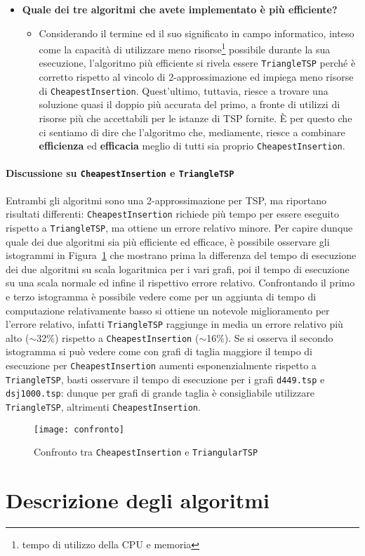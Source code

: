 \begin{itemize}
\begin{itemize}
	\end{itemize}
	\item \textbf{Quale dei tre algoritmi che avete implementato è più efficiente?}
	\begin{itemize}
		\item Considerando il termine  ed il suo significato in campo informatico, inteso come la capacità di utilizzare meno risorse\footnote{tempo di utilizzo della CPU e memoria} possibile durante la sua esecuzione, l'algoritmo più efficiente si rivela essere \texttt{TriangleTSP} perché è corretto rispetto al vincolo di 2-approssimazione ed impiega meno risorse di \texttt{CheapestInsertion}. Quest'ultimo, tuttavia, riesce a trovare una soluzione quasi il doppio più accurata del primo, a fronte di utilizzi di risorse più che accettabili per le istanze di TSP fornite. \`{E} per questo che ci sentiamo di dire che l'algoritmo che, mediamente, riesce a combinare \textbf{efficienza} ed \textbf{efficacia} meglio di tutti sia proprio \texttt{CheapestInsertion}.
	\end{itemize}
\end{itemize}


\paragraph{Discussione su \texttt{CheapestInsertion} e \texttt{TriangleTSP}} \label{ci-ttsp}
Entrambi gli algoritmi sono una 2-approssimazione per TSP, ma riportano risultati differenti: \texttt{CheapestInsertion} richiede più tempo per essere eseguito rispetto a \texttt{TriangleTSP}, ma ottiene un errore relativo minore.\eqcapo 
Per capire dunque quale dei due algoritmi sia più efficiente ed efficace, è possibile osservare gli istogrammi in Figura~\ref{confronto} che mostrano prima la differenza del tempo di esecuzione dei due algoritmi su scala logaritmica per i vari grafi, poi il tempo di esecuzione su una scala normale ed infine il rispettivo errore relativo. Confrontando il primo e terzo istogramma è possibile vedere come per un aggiunta di tempo di computazione relativamente basso si ottiene un notevole miglioramento per l'errore relativo, infatti \texttt{TriangleTSP} raggiunge in media un errore relativo più alto ($\sim$32\%) rispetto a \texttt{CheapestInsertion} ($\sim$16\%). Se si osserva il secondo istogramma si può vedere come con grafi di taglia maggiore il tempo di esecuzione per \texttt{CheapestInsertion} aumenti esponenzialmente rispetto a \texttt{TriangleTSP}, basti osservare il tempo di esecuzione per i grafi \texttt{d449.tsp} e \texttt{dsj1000.tsp}: dunque per grafi di grande taglia è consigliabile utilizzare \texttt{TriangleTSP}, altrimenti \texttt{CheapestInsertion}.

\begin{figure}[H]
	\centering
	\texttt{[image: confronto]}
	\caption{Confronto tra \texttt{CheapestInsertion} e \texttt{TriangularTSP}}
	\label{confronto}
\end{figure}

\newpage
\section{Descrizione degli algoritmi}

